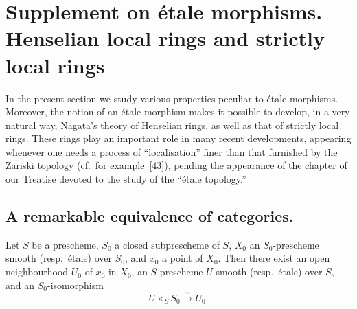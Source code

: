 \section{Supplement on \'etale morphisms. Henselian local rings and strictly local rings}
\label{section:IV.18}

In the present section we study various properties peculiar to \'etale morphisms.  Moreover, the notion of an \'etale morphism makes it possible to develop, in a very natural way, Nagata's theory of Henselian rings, as well as that of strictly local rings.  These rings play an important role in many recent developments, appearing whenever one needs a process of ``localisation'' finer than that furnished by the Zariski topology (cf.\ for example~[43]), pending the appearance of the chapter of our Treatise devoted to the study of the ``\'etale topology.''

\subsection{A remarkable equivalence of categories.}
\label{subsection:IV.18.1}

\begin{proposition}[18.1.1]
\label{IV.18.1.1}
Let $S$ be a prescheme, $S_0$ a closed subprescheme of $S$, $X_0$ an $S_0$-prescheme smooth (resp.\ \'etale) over $S_0$, and $x_0$ a point of $X_0$.  Then there exist an open neighbourhood $U_0$ of $x_0$ in $X_0$, an $S$-prescheme $U$ smooth (resp.\ \'etale) over $S$, and an $S_0$-isomorphism
\[
 U\times_SS_0\xrightarrow{\sim}U_0.
\]
\end{proposition}


